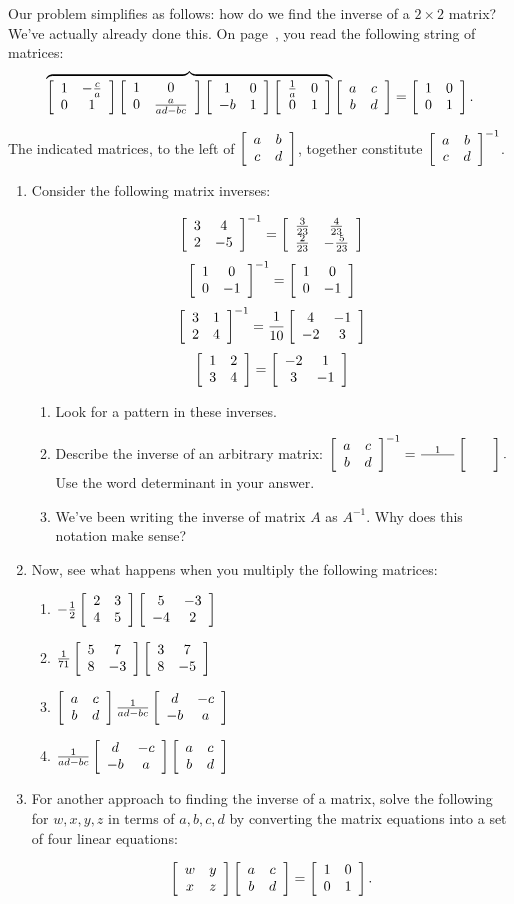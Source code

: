 \documentclass[../gatm.tex]{subfiles}
\begin{document}
Our problem simplifies as follows: how do we find the inverse of a $2\times 2$ matrix? We've actually already done this. On page~\pageref{prob:list_of_matrices}, you read the following string of matrices:
$$\overbrace{\twomat{1}{-\frac{c}{a}}{0}{1}\twomat{1}{0}{0}{\frac{a}{ad-bc}}\twomat{1}{0}{-b}{1}\twomat{\frac{1}{a}}{0}{0}{1}}\twomat{a}{c}{b}{d}=\twomat{1}{0}{0}{1}.$$

The indicated matrices, to the left of $\twomat{a}{b}{c}{d}$, together constitute $\twomat{a}{b}{c}{d}^{-1}$.

\begin{enumerate}
\setcounter{enumi}{\value{problem_i}}
\item Consider the following matrix inverses:

$$\twomat{3}{4}{2}{-5}^{-1}=\twomat{\frac{3}{23}}{\frac{4}{23}}{\frac{2}{23}}{-\frac{5}{23}}$$
$$\twomat{1}{0}{0}{-1}^{-1}=\twomat{1}{0}{0}{-1}$$
$$\twomat{3}{1}{2}{4}^{-1}=\frac{1}{10}\twomat{4}{-1}{-2}{3}$$
$$\twomat{1}{2}{3}{4} = \twomat{-2}{1}{3}{-1}$$

\begin{enumerate}
\item Look for a pattern in these inverses.
\item Describe the inverse of an arbitrary matrix: $\twomat{a}{c}{b}{d}^{-1}=\frac{1}{\phantom{000000}}\twomat{}{}{}{}.$ Use the word determinant in your answer.
\item We've been writing the inverse of matrix $A$ as $A^{-1}$. Why does this notation make sense?
\end{enumerate}
\item Now, see what happens when you multiply the following matrices:
\begin{multicols}{2}
\begin{enumerate}
\item $-\frac{1}{2}\twomat{2}{3}{4}{5}\twomat{5}{-3}{-4}{2}$
\item $\frac{1}{71}\twomat{5}{7}{8}{-3}\twomat{3}{7}{8}{-5}$
\item $\twomat{a}{c}{b}{d}\frac{1}{ad-bc}\twomat{d}{-c}{-b}{a}$
\item $\frac{1}{ad-bc}\twomat{d}{-c}{-b}{a}\twomat{a}{c}{b}{d}$
\end{enumerate}
\end{multicols}
\item For another approach to finding the inverse of a matrix, solve the following for $w,x,y,z$ in terms of $a,b,c,d$ by converting the matrix equations into a set of four linear equations:

$$\twomat{w}{y}{x}{z}\twomat{a}{c}{b}{d}=\twomat{1}{0}{0}{1}.$$
\setcounter{problem_i}{\value{enumi}}
\end{enumerate}
\end{document}
